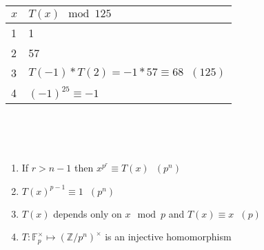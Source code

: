 \documentclass[11pt]{article}
\begin{document}
\begin{tabular}{l|l}
	$x$ & $T(x) \mod 125$     \\ \hline
	1 &  1                         \\
	2 &  57                             \\
	3 &  $T(-1)*T(2) = - 1 * 57 \equiv 68 \hspace{7pt} (125)$ \\
	4 &   $(-1)^{25} \equiv -1$                               \\
\end{tabular}
\\[3em]
\begin{theorem}\
	\begin{enumerate}
		\item{If $r>n-1$ then $x^{p^r} \equiv T(x) \hspace{7pt} (p^n)$}
		\item{$T(x)^{p-1} \equiv 1 \hspace{7pt} (p^n) $}
		\item{$T(x)$ depends only on $x \mod p$ and $T(x) \equiv x \hspace{7pt} (p) $}
		\item{$T\colon \mathbb{F}_p^\times  \mapsto (\mathbb{Z}/p^n)^\times$ is an injective homomorphism}
	\end{enumerate}
\end{theorem}
\newpage
\end{document}
